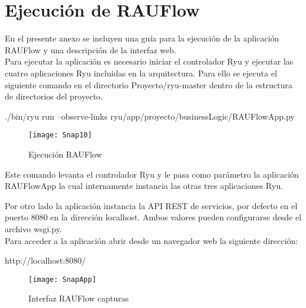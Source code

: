 
\chapter{Ejecuci\'on de RAUFlow}
\label{appendix5}

\ifpdf
    \graphicspath{{Appendix5/Figs/Raster/}{Appendix5/Figs/PDF/}{Appendix5/Figs/}}
\else
    \graphicspath{{Appendix5/Figs/Vector/}{Appendix5/Figs/}}
\fi

En el presente anexo se incluyen una guía para la ejecuci\'on de la aplicaci\'on RAUFlow y una descripción de la interfaz web.\\

Para ejecutar la aplicaci\'on es necesario iniciar el controlador Ryu y ejecutar las cuatro aplicaciones Ryu incluidas en la arquitectura. Para ello se ejecuta el siguiente comando en el directorio Proyecto/ryu-master dentro de la estructura de directorios del proyecto.

\begin{center}
./bin/ryu run --observe-links ryu/app/proyecto/businessLogic/RAUFlowApp.py

\end{center}

\begin{figure}[h] 
\centering    
\texttt{[image: Snap10]}
\caption[Ejecuci\'on RAUFlow]{Ejecuci\'on RAUFlow}
\label{fig:Img2}
\end{figure}

Este comando levanta el controlador Ryu y le pasa como parámetro la aplicaci\'on RAUFlowApp la cual internamente instancia las otras tres aplicaciones Ryu.

Por otro lado la aplicaci\'on instancia la API REST de servicios, por defecto en el puerto 8080 en la direcci\'on localhost. Ambos valores pueden configurarse desde el archivo wsgi.py.\\

Para acceder a la aplicaci\'on abrir desde un navegador web la siguiente direcci\'on:

\begin{center}
http://localhost:8080/
\end{center}


\begin{figure}[ht!] 
\centering    
\texttt{[image: SnapApp]}
\caption[Interfaz RAUFlow capturas]{Interfaz RAUFlow capturas}
\label{fig:Img2}
\end{figure}